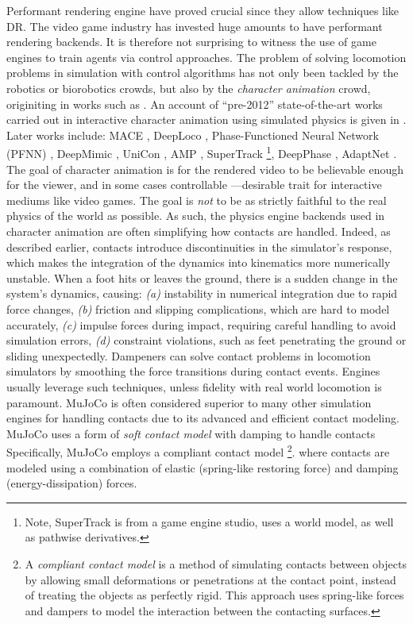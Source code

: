 \documentclass[12pt,a4paper]{article}
\begin{document}
Performant rendering engine have proved crucial since they allow techniques like DR.
The video game industry has invested huge amounts to have performant rendering backends.
It is therefore not surprising to witness the use of game engines to train agents via control
approaches.
The problem of solving locomotion problems in simulation with control algorithms
has not only been tackled by the
robotics or biorobotics crowds, but also by the \emph{character animation} crowd,
originiting in works such as \cite{Raibert1991-wu, Van_de_Panne1993-is, Grzeszczuk1998-ij}.
An account of ``pre-2012'' state-of-the-art works carried out in
interactive character animation using simulated physics
is given in \cite{Geijtenbeek2012-mq}.
Later works include: MACE \cite{Peng2016-fs},
DeepLoco \cite{Peng2017-fg},
Phase-Functioned Neural Network (PFNN) \cite{Holden2017-wv},
DeepMimic \cite{Peng2018-ap},
UniCon \cite{Wang2020-cz},
AMP \cite{Peng2021-ge},
SuperTrack \cite{Fussell2021-uf}
\footnote{Note, SuperTrack is from a game engine studio,
uses a world model, as well as pathwise derivatives.},
DeepPhase \cite{Starke2022-za},
AdaptNet \cite{Xu2023-ug}.
The goal of character animation is for the rendered video to be believable enough for the viewer,
and in some cases controllable ---desirable trait for interactive mediums like video games.
The goal is \emph{not} to be as strictly faithful to the real physics of the world as possible.
As such, the physics engine backends used in character animation are often simplifying how
contacts are handled. Indeed, as described earlier, contacts introduce discontinuities in the
simulator's response, which makes the integration of the dynamics into kinematics more numerically
unstable. When a foot hits or leaves the ground, there is a sudden change in the system's dynamics,
causing:
\textit{(a)} instability in numerical integration due to rapid force changes,
\textit{(b)} friction and slipping complications, which are hard to model accurately,
\textit{(c)} impulse forces during impact, requiring careful handling to avoid simulation errors,
\textit{(d)} constraint violations, such as feet penetrating the ground or sliding unexpectedly.
Dampeners can solve contact problems in locomotion simulators by smoothing the force transitions
during contact events. Engines usually leverage such techniques, unless fidelity with real world
locomotion is paramount.
MuJoCo \cite{Todorov2012-gc} is often considered superior to many other simulation engines
for handling contacts due to its advanced and efficient contact modeling.
MuJoCo uses a form of \emph{soft contact model} with damping to handle contacts
Specifically, MuJoCo employs a compliant contact model
\footnote{A \emph{compliant contact model} is a method of simulating contacts between objects by
allowing small deformations or penetrations at the contact point, instead of treating the objects
as perfectly rigid. This approach uses spring-like forces and dampers to model the interaction
between the contacting surfaces.}.
where contacts are modeled using a
combination of elastic (spring-like restoring force) and damping (energy-dissipation) forces.
\end{document}
